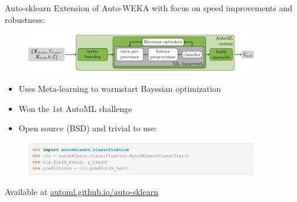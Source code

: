 \begin{frame}[c]{Auto-sklearn}
Extension of Auto-WEKA with focus on speed improvements and robustness:
\begin{figure}
    \centering
    \includegraphics[width=0.9\textwidth]{images/success_stories/automlworkflow.pdf}
\end{figure}
\begin{itemize}
    \item Uses Meta-learning to warmstart Bayesian optimization
    \item Won the 1st AutoML challenge
    \item Open source (BSD) and trivial to use:
\end{itemize}
\begin{figure}
    \centering
    \includegraphics[width=0.9\textwidth]{images/success_stories/Auto-sklearn_01.png}
\end{figure}
Available at \href{http://automl.github.io/auto-sklearn}{automl.github.io/auto-sklearn}
\end{frame}



